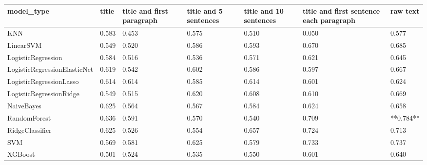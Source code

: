\begin{tabular}{lllllll}
\toprule
                  model\_type & title & title and first paragraph & title and 5 sentences & title and 10 sentences & title and first sentence each paragraph &  raw text \\
\midrule
                         KNN & 0.583 &                     0.453 &                 0.575 &                  0.510 &                                   0.050 &     0.577 \\
                   LinearSVM & 0.549 &                     0.520 &                 0.586 &                  0.593 &                                   0.670 &     0.685 \\
          LogisticRegression & 0.584 &                     0.516 &                 0.536 &                  0.571 &                                   0.621 &     0.645 \\
LogisticRegressionElasticNet & 0.619 &                     0.542 &                 0.602 &                  0.586 &                                   0.597 &     0.667 \\
     LogisticRegressionLasso & 0.614 &                     0.614 &                 0.585 &                  0.614 &                                   0.601 &     0.624 \\
     LogisticRegressionRidge & 0.549 &                     0.515 &                 0.620 &                  0.608 &                                   0.610 &     0.669 \\
                  NaiveBayes & 0.625 &                     0.564 &                 0.567 &                  0.584 &                                   0.624 &     0.658 \\
                RandomForest & 0.636 &                     0.591 &                 0.570 &                  0.540 &                                   0.709 & **0.784** \\
             RidgeClassifier & 0.625 &                     0.526 &                 0.554 &                  0.657 &                                   0.724 &     0.713 \\
                         SVM & 0.569 &                     0.581 &                 0.625 &                  0.579 &                                   0.733 &     0.737 \\
                     XGBoost & 0.501 &                     0.524 &                 0.535 &                  0.550 &                                   0.601 &     0.640 \\
\bottomrule
\end{tabular}
